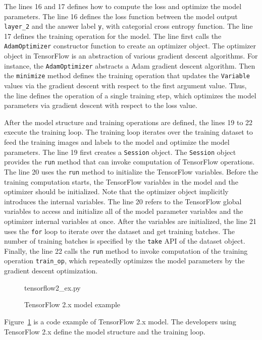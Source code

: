The lines 16 and 17 defines how to compute the loss and optimize the model
parameters.
The line 16 defines the loss function between the model output {\tt layer\_2} 
and the answer label {\tt y}, with categorial cross entropy function.
The line 17 defines the training operation for the model.
The line first calls the {\tt AdamOptimizer} constructor
function to create an optimizer object.
The optimizer object in TensorFlow is an abstraction of various gradient
descent algorithms.
For instance, the {\tt AdamOptimizer} abstracts a Adam gradient descent
algorithm. %
Then the {\tt minimize} method defines the training operation that updates the
{\tt Variable} values via the gradient descent with respect
to the first argument value.
Thus, the line defines the operation of a single training step,
which optimizes the model parameters via gradient descent with respect to
the loss value.

After the model structure and training operations are defined, 
the lines 19 to 22 execute the training loop.
The training loop iterates over the training dataset to feed the training
images and labels to the model and optimize the model parameters. 
The line 19 first creates a {\tt Session} object.
The {\tt Session} object provides the {\tt run} method that can invoke
computation of TensorFlow operations.
The line 20 uses the {\tt run} method to initialize the TensorFlow variables.
Before the training computation starts,
the TensorFlow variables in the model and the optimizer should be initialized.
Note that the optimizer object implicitly introduces the internal variables.
The line 20 refers to the TensorFlow global variables to access and initialize
all of the model parameter variables and the optimizer internal variables
at once.
After the variables are initialized, the line 21 uses the {\tt for} loop
to iterate over the dataset and get training batches. 
The number of training batches is specified by the {\tt take} API of the
dataset object.
Finally, the line 22 calls the {\tt run} method to
invoke computation of the training operation {\tt train\_op},
which repeatedly optimizes the model parameters by the gradient descent
optimization.


\begin{figure}[ht!]

{tensorflow2_ex.py}
  \caption{TensorFlow 2.x model example}
\label{fig:back:tf2}
\end{figure}

Figure~\ref{fig:back:tf2} is a code example of TensorFlow 2.x model.
The developers using TensorFlow 2.x define the model structure and
the training loop. 

